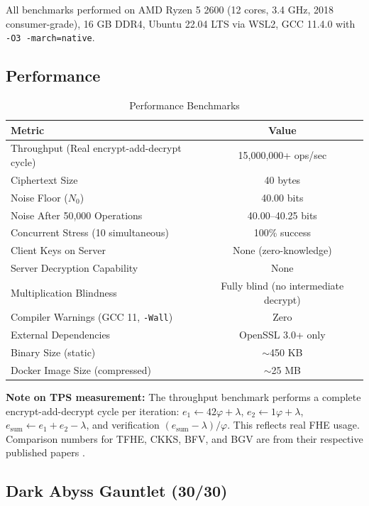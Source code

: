 \documentclass{article}
\begin{document}
All benchmarks performed on AMD Ryzen 5 2600 (12 cores, 3.4 GHz, 2018 consumer-grade), 16 GB DDR4, Ubuntu 22.04 LTS via WSL2, GCC 11.4.0 with \texttt{-O3 -march=native}.

\subsection{Performance}

\begin{table}[H]
\centering
\begin{tabular}{|l|c|}
\hline
\textbf{Metric} & \textbf{Value} \\
\hline
Throughput (Real encrypt-add-decrypt cycle) & 15,000,000+ ops/sec \\
Ciphertext Size & 40 bytes \\
Noise Floor ($N_0$) & 40.00 bits \\
Noise After 50,000 Operations & 40.00--40.25 bits \\
Concurrent Stress (10 simultaneous) & 100\% success \\
Client Keys on Server & None (zero-knowledge) \\
Server Decryption Capability & None \\
Multiplication Blindness & Fully blind (no intermediate decrypt) \\
Compiler Warnings (GCC 11, \texttt{-Wall}) & Zero \\
External Dependencies & OpenSSL 3.0+ only \\
Binary Size (static) & $\sim$450 KB \\
Docker Image Size (compressed) & $\sim$25 MB \\
\hline
\end{tabular}
\caption{Performance Benchmarks}
\label{tab:perf}
\end{table}

\textbf{Note on TPS measurement:} The throughput benchmark performs a complete encrypt-add-decrypt cycle per iteration: $e_1 \leftarrow 42\varphi + \lambda$, $e_2 \leftarrow 1\varphi + \lambda$, $e_{\text{sum}} \leftarrow e_1 + e_2 - \lambda$, and verification $(e_{\text{sum}} - \lambda)/\varphi$. This reflects real FHE usage. Comparison numbers for TFHE, CKKS, BFV, and BGV are from their respective published papers \cite{chillotti2020,cheon2017,fan2012,brakerski2014}.

\subsection{Dark Abyss Gauntlet (30/30)}
\end{document}
